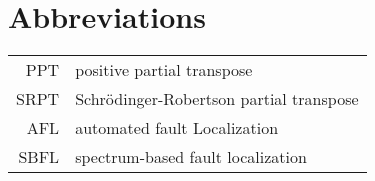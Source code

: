 \chapter*{Abbreviations} 

\begin{longtable}{rl}
PPT & positive partial transpose\\
SRPT & Schr\"odinger-Robertson partial transpose\\
AFL & automated fault Localization\\
SBFL & spectrum-based fault localization
\end{longtable}